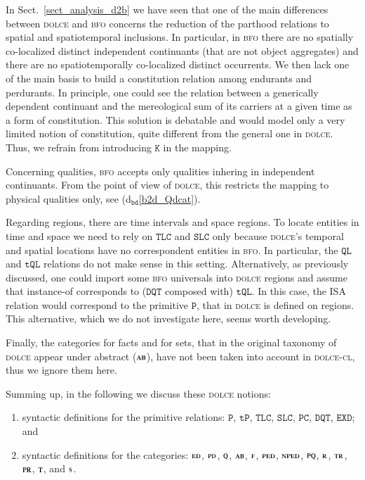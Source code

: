 \documentclass[ao]{iosart2x}
\newcommand{\bdDefLabel}{\textrm{d$_\texttt{bd}$}}
\newcommand{\refbddf}[1]{({\bdDefLabel}\ref{#1})}
\newcommand{\pr}[1]{\mathtt{#1}}
\newcommand{\dolce}{{\textsc{dolce}}}
\newcommand{\bfo}{{\textsc{bfo}}}
\newcommand {\ABdcat} {\textsc{ab}}
\newcommand {\EDdcat} {\textsc{ed}}
\newcommand {\Fdcat} {\textsc{f}}
\newcommand {\NPEDdcat} {\textsc{nped}}
\newcommand {\PDdcat} {\textsc{pd}}
\newcommand {\PEDdcat} {\textsc{ped}}
\newcommand {\PQdcat} {\textsc{pq}}
\newcommand {\PRdcat} {\textsc{pr}}
\newcommand {\Qdcat} {\textsc{q}}
\newcommand {\Rdcat} {\textsc{r}}
\newcommand {\Sdcat} {\textsc{s}}
\newcommand {\TRdcat} {\textsc{tr}}
\newcommand {\Tdcat} {\textsc{t}}
\newcommand {\TPd} {\ensuremath{\pr{tP}}}
\newcommand {\Pd} {\ensuremath{\pr{P}}}
\newcommand {\DQTd} {\ensuremath{\pr{DQT}}}
\newcommand {\QLd} {\ensuremath{\pr{QL}}}
\newcommand {\TQLd} {\ensuremath{\pr{tQL}}}
\newcommand {\PCd} {\ensuremath{\pr{PC}}}
\newcommand {\Kd} {\ensuremath{\pr{K}}}
\newcommand {\EXDd} {\ensuremath{\pr{EXD}}}
\newcommand {\SLCd} {\ensuremath{\pr{SLC}}}
\newcommand {\TLCd} {\ensuremath{\pr{TLC}}}
\begin{document}
In Sect.~\ref{sect_analysis_d2b} we have seen that one of the main differences between {\dolce} and {\bfo} concerns the reduction of the parthood relations to spatial and spatiotemporal inclusions. In particular, in {\bfo} there are no spatially co-localized distinct independent continuants (that are not object aggregates) and there are no spatiotemporally co-localized distinct occurrents. We then lack one of the main basis to build a constitution relation among endurants and perdurants. In principle, one could see the relation between a generically dependent continuant and the mereological sum of its carriers at a given time as a form of constitution. This solution is debatable and would model only a very limited notion of constitution, quite different from the general one in {\dolce}. Thus, we refrain from introducing $\Kd$ in the mapping.  

Concerning qualities, {\bfo} accepts only qualities inhering in independent continuants. From the point of view of {\dolce}, this restricts the mapping to physical qualities only, see \refbddf{b2d_Qdcat}. 

Regarding regions, there are time intervals and space regions. To locate entities in time and space we need to rely on $\TLCd$ and $\SLCd$ only because {\dolce}'s temporal and spatial locations have no correspondent entities in {\bfo}. In particular, the $\QLd$ and $\TQLd$ relations do not make sense in this setting. Alternatively, as previously discussed, one could import some {\bfo} universals into {\dolce} regions and assume that instance-of corresponds to ($\DQTd$ composed with) $\TQLd$. In this case, the ISA relation would correspond to the primitive $\Pd$, that in {\dolce} is defined on regions. This alternative, which we do not investigate here, seems worth developing. %
%

Finally, the categories for facts and for sets, that in the original taxonomy of {\dolce} \citep{D18} appear under abstract ($\ABdcat$), have not been taken into account in {\dolce}-\textsc{cl}, thus we ignore them here. 
 

\smallskip
Summing up, in the following we discuss these {\dolce} notions: 
\begin{enumerate}[$(i)$]
\item syntactic definitions for the primitive relations: $\Pd$, $\TPd$, $\TLCd$, $\SLCd$, $\PCd$, $\DQTd$, $\EXDd$; and 
\item syntactic definitions for the categories: $\EDdcat$, $\PDdcat$, $\Qdcat$, $\ABdcat$, $\Fdcat$, $\PEDdcat$, $\NPEDdcat$, $\PQdcat$, $\Rdcat$, $\TRdcat$, $\PRdcat$, $\Tdcat$, and $\Sdcat$.
\end{enumerate}
\end{document}
